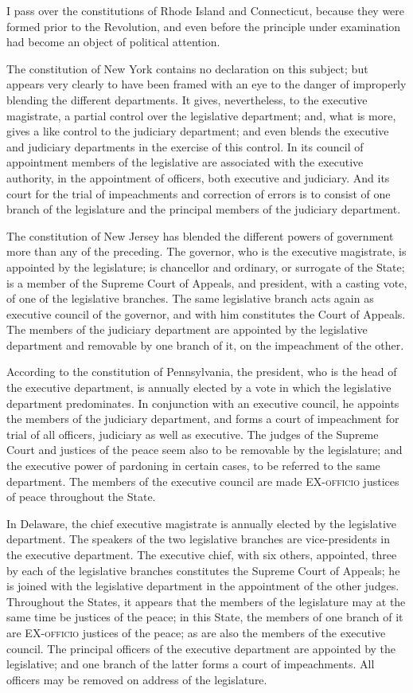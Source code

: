 I pass over the constitutions of Rhode Island and Connecticut, because they were formed prior to the Revolution, and even before the principle under examination had become an object of political attention.

The constitution of New York contains no declaration on this subject; but appears very clearly to have been framed with an eye to the danger of improperly blending the different departments. It gives, nevertheless, to the executive magistrate, a partial control over the legislative department; and, what is more, gives a like control to the judiciary department; and even blends the executive and judiciary departments in the exercise of this control. In its council of appointment members of the legislative are associated with the executive authority, in the appointment of officers, both executive and judiciary. And its court for the trial of impeachments and correction of errors is to consist of one branch of the legislature and the principal members of the judiciary department.

The constitution of New Jersey has blended the different powers of government more than any of the preceding. The governor, who is the executive magistrate, is appointed by the legislature; is chancellor and ordinary, or surrogate of the State; is a member of the Supreme Court of Appeals, and president, with a casting vote, of one of the legislative branches. The same legislative branch acts again as executive council of the governor, and with him constitutes the Court of Appeals. The members of the judiciary department are appointed by the legislative department and removable by one branch of it, on the impeachment of the other.

According to the constitution of Pennsylvania, the president, who is the head of the executive department, is annually elected by a vote in which the legislative department predominates. In conjunction with an executive council, he appoints the members of the judiciary department, and forms a court of impeachment for trial of all officers, judiciary as well as executive. The judges of the Supreme Court and justices of the peace seem also to be removable by the legislature; and the executive power of pardoning in certain cases, to be referred to the same department. The members of the executive council are made EX-\textsc{officio }justices of peace throughout the State.

In Delaware, the chief executive magistrate is annually elected by the legislative department. The speakers of the two legislative branches are vice-presidents in the executive department. The executive chief, with six others, appointed, three by each of the legislative branches constitutes the Supreme Court of Appeals; he is joined with the legislative department in the appointment of the other judges. Throughout the States, it appears that the members of the legislature may at the same time be justices of the peace; in this State, the members of one branch of it are EX-\textsc{officio }justices of the peace; as are also the members of the executive council. The principal officers of the executive department are appointed by the legislative; and one branch of the latter forms a court of impeachments. All officers may be removed on address of the legislature.

